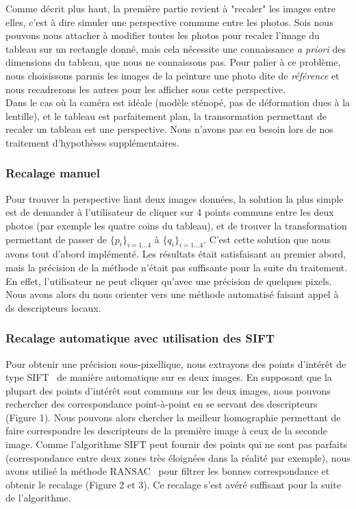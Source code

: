 \documentclass[12pt,a4paper]{article}
\begin{document}
Comme décrit plus haut, la première partie revient à "recaler" les images entre elles, c'est à dire simuler une perspective commune entre les photos. Sois nous pouvons nous attacher à modifier toutes les photos pour recaler l'image du tableau sur un rectangle donné, mais cela nécessite une connaissance \emph{a priori} des dimensions du tableau, que nous ne connaissons pas. Pour palier à ce problème, nous choisissons parmis les images de la peinture une photo dite de \emph{référence} et nous recadrerons les autres pour les afficher sous cette perspective.\\

Dans le cas où la caméra est idéale (modèle sténopé, pas de déformation dues à la lentille), et le tableau est parfaitement plan, la transormation permettant de recaler un tableau est une perspective. Nous n'avons pas eu besoin lors de nos traitement d'hypothèses supplémentaires.

\subsubsection{Recalage manuel}
Pour trouver la perspective liant deux images données, la solution la plus simple est de demander à l'utilisateur de cliquer sur 4 points communs entre les deux photos (par exemple les quatre coins du tableau), et de trouver la transformation permettant de passer de $\{p_i\}_{i=1...4}$ à  $\{q_i\}_{i=1...4}$. C'est cette solution que nous avons tout d'abord implémenté. Les résultats était satisfaisant au premier abord, mais la précision de la méthode n'était pas suffisante pour la suite du traitement. En effet, l'utilisateur ne peut cliquer qu'avec une précision de quelques pixels. Nous avons alors du nous orienter vers une méthode automatisé faisant appel à ds descripteurs locaux.

\subsubsection{Recalage automatique avec utilisation des  SIFT}

Pour obtenir une précision sous-pixellique, nous extrayons des points d'intérêt de type SIFT~\citep{lowe1999object} de manière automatique sur es deux images. En supposant que la plupart des points d'intérêt sont communs sur les deux images, nous pouvons rechercher des correspondance point-à-point en se servant des descripteurs (Figure 1). Nous pouvons alors chercher la meilleur homographie permettant de faire correspondre les descripteurs de la première image à ceux de la seconde image. Comme l'algorithme SIFT peut fournir des points qui ne sont pas parfaits (correspondance entre deux zones très éloignées dans la réalité par exemple), nous avons utilisé la méthode RANSAC~\citep{fischler1981random} pour filtrer les bonnes correspondance et obtenir le recalage (Figure 2 et 3). Ce recalage s'est avéré suffisant pour la suite de l'algorithme.
\end{document}
